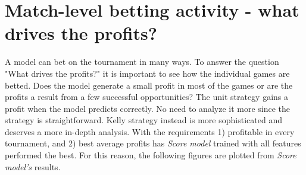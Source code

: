 \section{Match-level betting activity - what drives the profits?}
A model can bet on the tournament in many ways. To answer the question "What drives the profits?" it is important to see how the individual games are betted. Does the model generate a small profit in most of the games or are the profits a result from a few successful opportunities? The unit strategy gains a profit when the model predicts correctly. No need to analyze it more since the strategy is straightforward. Kelly strategy instead is more sophisticated and deserves a more in-depth analysis. With the requirements 1) profitable in every tournament, and 2) best average profits has \textit{Score model} trained with all features performed the best. For this reason, the following figures are plotted from \textit{Score model's} results.

